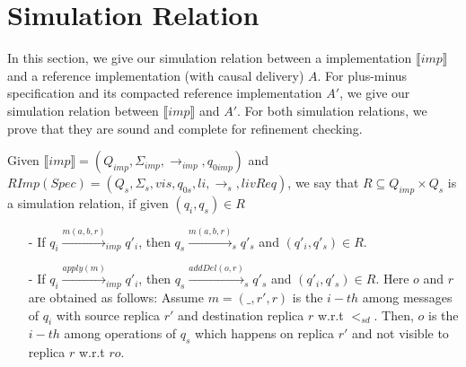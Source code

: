 






\forget
{
\section{Simulation Relation}
\label{sec:simulation relation}

In this section, we give our simulation relation between a implementation $\llbracket imp \rrbracket$ and a reference implementation (with causal delivery) $A$. For plus-minus specification and its compacted reference implementation $A'$, we give our simulation relation between $\llbracket imp \rrbracket$ and $A'$. For both simulation relations, we prove that they are sound and complete for refinement checking.

Given $\llbracket imp \rrbracket = (Q_{imp},\Sigma_{imp},\rightarrow_{imp},q_{0imp})$ and $RImp(Spec) = (Q_s,\Sigma_s,vis,q_{0s},li,\rightarrow_s,livReq)$, we say that $R \subseteq Q_{imp} \times Q_s$ is a simulation relation, if given $(q_i,q_s) \in R$

\begin{itemize}
\setlength{\itemsep}{0.5pt}
\item[-] If $q_i {\xrightarrow{m(a,b,r)}}_{imp} q'_i$, then $q_s {\xrightarrow{m(a,b,r)}}_s q'_s$ and $(q'_i,q'_s) \in R$.

\item[-] If $q_i {\xrightarrow{apply(m)}}_{imp} q'_i$, then $q_s {\xrightarrow{addDel(o,r)}}_s q'_s$ and $(q'_i,q'_s) \in R$. Here $o$ and $r$ are obtained as follows: Assume $m=(\_,r',r)$ is the $i-th$ among messages of $q_i$ with source replica $r'$ and destination replica $r$ w.r.t $<_{sd}$. Then, $o$ is the $i-th$ among operations of $q_s$ which happens on replica $r'$ and not visible to replica $r$ w.r.t $ro$.
\end{itemize}




}
